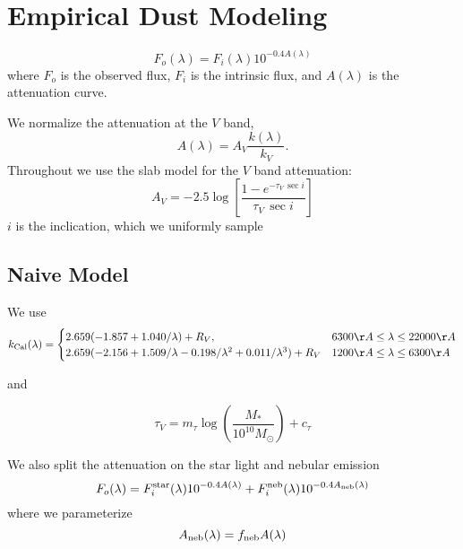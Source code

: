 \section{Empirical Dust Modeling} \label{sec:methods}

\begin{equation} 
    F_o (\lambda) = F_i (\lambda) 10^{-0.4 A(\lambda)}
\end{equation}
where $F_o$ is the observed flux, $F_i$ is the intrinsic flux, and $A(\lambda)$
is the attenuation curve. 

We normalize the attenuation at the $V$ band, 
\begin{equation} 
    A(\lambda) = A_V \frac{k(\lambda)}{k_V}. 
\end{equation}
Throughout we use the slab model \citep{somerville1999, somerville2012} for the $V$ band
attenuation:  
\begin{equation} 
    A_V = -2.5 \log \left[ \frac{1 - e^{-\tau_V\,\sec i}}{\tau_V\,\sec i} \right]
\end{equation}
$i$ is the inclication, which we uniformly sample 

\subsection{Naive Model} 
We use \cite{calzetti2001} 
\[
    k_{\rm Cal}(\lambda) = 
    \begin{cases} 
        2.659 (-1.857 + 1.040/\lambda) + R_V, & 6300 \AA \le \lambda \le
        22000 \AA \\ 
        2.659 (-2.156 + 1.509/\lambda - 0.198/\lambda^2 + 0.011/\lambda^3) +
        R_V & 1200 \AA \le \lambda \le 6300 \AA
    \end{cases}
\]

and 

\begin{equation}
    \tau_V = m_\tau \log \left(\frac{M_*}{10^{10} M_\odot}\right) + c_\tau
\end{equation} 

We also split the attenuation on the star light and nebular emission 
\begin{equation} 
    F_o (\lambda) = F^{\rm star}_i (\lambda) 10^{-0.4 A(\lambda)} + F^{\rm
    neb}_i (\lambda) 10^{-0.4 A_{\rm neb}(\lambda)}
\end{equation}
where we parameterize
\begin{equation}
    A_{\rm neb}(\lambda) = f_{\rm neb}  A(\lambda) 
\end{equation} 

